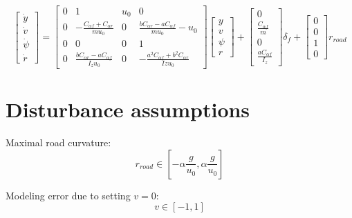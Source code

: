 \documentclass[letterpaper, 12pt]{article}
\begin{document}
\begin{equation}
	\begin{bmatrix}
		\dot y \\
		\dot v \\
		\dot \psi \\
		\dot r
	\end{bmatrix}
	= 
	\begin{bmatrix}
	0 & 1 & u_0 & 0 \\
    0 & -\frac{C_{\alpha f}+C_{\alpha r}}{m u_0}  & 0 & \frac{b C_{\alpha r}-a C_{\alpha f}}{m u_0} - u_0 \\
    0 & 0 & 0 & 1 \\
    0 & \frac{b C_{\alpha r}-a C_{\alpha f}}{I_z u_0} & 0 & - \frac{a^2   C_{\alpha f} + b^2   C_{\alpha r}}{Iz u_0}
	\end{bmatrix} 
	\begin{bmatrix}
		y \\
		v \\
		\psi \\
		r
	\end{bmatrix}
	+ 
	\begin{bmatrix}
		0 \\ \frac{C_{\alpha f}}{m} \\ 0 \\ \frac{a C_{\alpha f}}{I_z}
	\end{bmatrix}
	\delta_f
	+ \begin{bmatrix}
		0 \\
		0 \\
		1 \\
		0 
	\end{bmatrix} 
		r_{road} 
\end{equation}


\section{Disturbance assumptions} %
\label{sec:assumptions}

Maximal road curvature: 
\begin{equation}
	r_{road} \in [- \alpha \frac{g}{u_0}, \alpha \frac{g}{u_0}]
\end{equation}

Modeling error due to setting $v=0$:
\begin{equation}
	v \in [-1, 1]
\end{equation}

\end{document}
